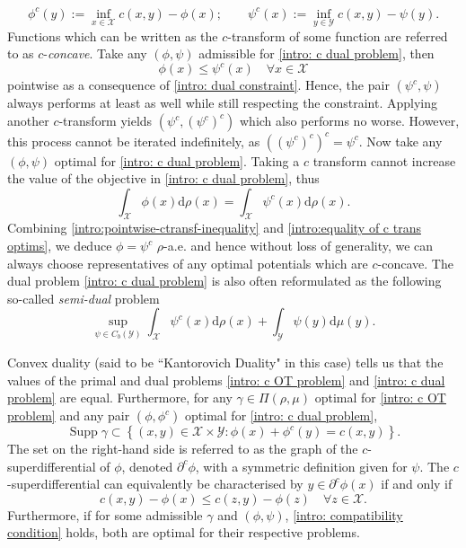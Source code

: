 \documentclass[11pt, oneside, titlepage]{book}
\theoremstyle{plain}
\theoremstyle{definition}
\newcommand{\X}{\mathcal{X}}
\newcommand{\Y}{\mathcal{Y}}
\newcommand{\di}{\mathrm{d}}
\DeclareMathOperator{\supp}{Supp}
\begin{document}
\begin{equation}
\label{intro: c transf definition}
    \phi^c(y) := \inf_{x \in \X} c(x, y) - \phi(x) ; \quad\quad \psi^c(x):= \inf_{y \in \Y} c(x, y) - \psi(y).
\end{equation}
Functions which can be written as the $c$-transform of some function are referred to as $c$-\textit{concave}.
Take any $(\phi, \psi)$ admissible for \eqref{intro: c dual problem}, then
\begin{equation}
\label{intro:pointwise-ctransf-inequality}
\phi(x) \leq \psi^c(x) \quad \forall x \in \X
\end{equation}
pointwise as a consequence of \eqref{intro: dual constraint}. Hence, the pair $(\psi^c, \psi)$ always performs at least as well while still respecting the constraint. Applying another $c$-transform yields $(\psi^c, (\psi^c)^c)$ which also performs no worse. However, this process cannot be iterated indefinitely, as $((\psi^c)^c)^c = \psi^c$. Now take any $(\phi, \psi)$ optimal for \eqref{intro: c dual problem}. Taking a $c$ transform cannot increase the value of the objective in \eqref{intro: c dual problem}, thus
\begin{equation}
\label{intro:equality of c trans optims}
    \int_\X \phi(x) \di \rho(x) = \int_\X \psi^c(x) \di \rho(x).
\end{equation}
Combining \eqref{intro:pointwise-ctransf-inequality} and \eqref{intro:equality of c trans optims}, we deduce $\phi = \psi^c$  $\rho$-a.e. and hence without loss of generality, we can always choose representatives of any optimal potentials which are $c$-concave. The dual problem \eqref{intro: c dual problem} is also often reformulated as the following so-called \textit{semi-dual} problem
\begin{equation}
\label{intro: c semidual problem}
    \sup_{\psi \in C_b(\Y)} \int_\X \psi^c(x) \di \rho(x) + \int_\Y \psi(y) \di \mu(y).
\end{equation}

Convex duality (said to be ``Kantorovich Duality" in this case) tells us that the values of the primal and dual problems \eqref{intro: c OT problem} and \eqref{intro: c dual problem} are equal. Furthermore, for any $\gamma \in \Pi(\rho, \mu)$ optimal for \eqref{intro: c OT problem} and any pair $(\phi, \phi^c)$ optimal for \eqref{intro: c dual problem},
\begin{equation}
    \label{intro: compatibility condition}
    \supp \gamma \subset \left\{ (x, y) \in \X \times \Y : \phi(x) + \phi^c(y) = c(x, y) \right\}.
\end{equation}
The set on the right-hand side is referred to as the graph of the $c$-superdifferential of $\phi$, denoted $\partial^c \phi$, with a symmetric definition given for $\psi$. The $c$-superdifferential can equivalently be characterised by $y \in \partial^c\phi(x)$ if and only if
\begin{equation}
\label{eq: c superdiff}
    c(x, y) - \phi(x) \leq c(z, y) - \phi(z) \quad \forall z \in \X.
\end{equation}
Furthermore, if for some admissible $\gamma$ and $(\phi, \psi)$, \eqref{intro: compatibility condition} holds, both are optimal for their respective problems.
\end{document}
